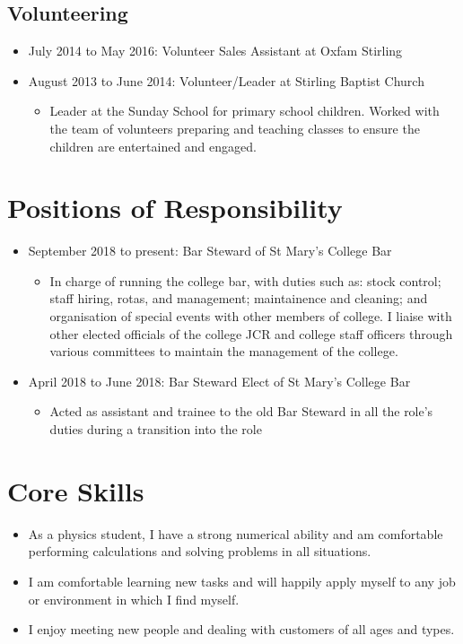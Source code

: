 \documentclass[10pt, a4paper]{article}
\begin{document}
	\subsection{Volunteering}
	\begin{itemize}
		\item July 2014 to May 2016: Volunteer Sales Assistant at Oxfam Stirling
		\item August 2013 to June 2014: Volunteer/Leader at Stirling Baptist Church
		\begin{itemize}
			\item Leader at the Sunday School for primary school children. Worked with the team of volunteers preparing and teaching classes to ensure the children are entertained and engaged.
		\end{itemize}
	\end{itemize}

\section{Positions of Responsibility}
\begin{itemize}
    \item September 2018 to present: Bar Steward of St Mary's College Bar
        \begin{itemize}
            \item In charge of running the college bar, with duties such as: stock control; staff hiring, rotas, and management; maintainence and cleaning; and organisation of special events with other members of college. 
                I liaise with other elected officials of the college JCR and college staff officers through various committees to maintain the management of the college.
        \end{itemize}
    \item April 2018 to June 2018: Bar Steward Elect of St Mary's College Bar
        \begin{itemize}
            \item Acted as assistant and trainee to the old Bar Steward in all the role's duties during a transition into the role
        \end{itemize}
\end{itemize}

\section{Core Skills}
\begin{itemize}
	\item As a physics student, I have a strong numerical ability and am comfortable performing calculations and solving problems in all situations.
	\item I am comfortable learning new tasks and will happily apply myself to any job or environment in which I find myself.
	\item I enjoy meeting new people and dealing with customers of all ages and types.
\end{itemize}
\end{document}
